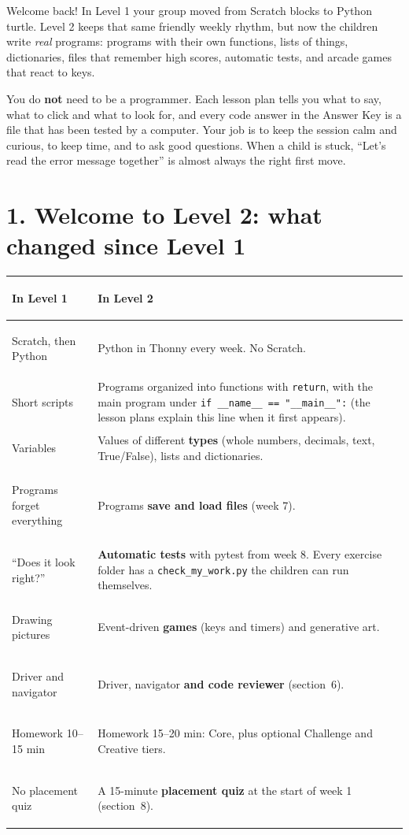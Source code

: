 \documentclass[level=2,teacher]{kidscode}
\begin{document}

\begin{teachernote}
Welcome back! In Level 1 your group moved from Scratch blocks to Python turtle. Level 2
keeps that same friendly weekly rhythm, but now the children write \emph{real} programs:
programs with their own functions, lists of things, dictionaries, files that remember
high scores, automatic tests, and arcade games that react to keys.

You do \textbf{not} need to be a programmer. Each lesson plan tells you what to say,
what to click and what to look for, and every code answer in the Answer Key is a file
that has been tested by a computer. Your job is to keep the session calm and curious,
to keep time, and to ask good questions. When a child is stuck, \enquote{Let's read the
error message together} is almost always the right first move.
\end{teachernote}

\setcounter{tocdepth}{1}
\tableofcontents
\clearpage

\section{1. Welcome to Level 2: what changed since Level 1}

\begin{tabularx}{\linewidth}{@{}>{\bfseries\raggedright\arraybackslash}p{3.4cm}X@{}}
\toprule
In Level 1 & In Level 2 \\ \midrule
Scratch, then Python & Python in Thonny every week. No Scratch. \\
Short scripts & Programs organized into functions with \texttt{return}, with the main program under
\texttt{if \_\_name\_\_ == "\_\_main\_\_":} (the lesson plans explain this line when it first appears). \\
Variables & Values of different \textbf{types} (whole numbers, decimals, text, True/False), lists and dictionaries. \\
Programs forget everything & Programs \textbf{save and load files} (week 7). \\
\enquote{Does it look right?} & \textbf{Automatic tests} with pytest from week 8. Every exercise folder has a
\texttt{check\_my\_work.py} the children can run themselves. \\
Drawing pictures & Event-driven \textbf{games} (keys and timers) and generative art. \\
Driver and navigator & Driver, navigator \textbf{and code reviewer} (section~6). \\
Homework 10--15 min & Homework 15--20 min: Core, plus optional Challenge and Creative tiers. \\
No placement quiz & A 15-minute \textbf{placement quiz} at the start of week 1 (section~8). \\
\bottomrule
\end{tabularx}
\end{document}
